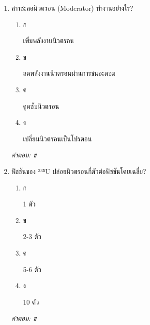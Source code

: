 \documentclass[12pt]{article}
\begin{document}
\begin{enumerate}[label=\arabic*., itemsep=0.5\baselineskip, topsep=0.5\baselineskip, leftmargin=*]
\item สารชะลอนิวตรอน (Moderator) ทำงานอย่างไร?
\begin{enumerate}[label=\alph*)., itemsep=0.3\baselineskip, topsep=0.3\baselineskip]
\item ก\ 
\begin{minipage}[t]{0.9\linewidth}
\raggedright เพิ่มพลังงานนิวตรอน
\end{minipage}
\item ข\ 
\begin{minipage}[t]{0.9\linewidth}
\raggedright ลดพลังงานนิวตรอนผ่านการชนอะตอม
\end{minipage}
\item ค\ 
\begin{minipage}[t]{0.9\linewidth}
\raggedright ดูดซับนิวตรอน
\end{minipage}
\item ง\ 
\begin{minipage}[t]{0.9\linewidth}
\raggedright เปลี่ยนนิวตรอนเป็นโปรตอน
\end{minipage}
\end{enumerate}
\vspace{-0.3\baselineskip}
\begin{small}
\textit{คำตอบ: ข}
\end{small}

\item ฟิชชันของ ²³⁵U ปล่อยนิวตรอนกี่ตัวต่อฟิชชันโดยเฉลี่ย?
\begin{enumerate}[label=\alph*)., itemsep=0.3\baselineskip, topsep=0.3\baselineskip]
\item ก\ 
\begin{minipage}[t]{0.9\linewidth}
\raggedright 1 ตัว
\end{minipage}
\item ข\ 
\begin{minipage}[t]{0.9\linewidth}
\raggedright 2-3 ตัว
\end{minipage}
\item ค\ 
\begin{minipage}[t]{0.9\linewidth}
\raggedright 5-6 ตัว
\end{minipage}
\item ง\ 
\begin{minipage}[t]{0.9\linewidth}
\raggedright 10 ตัว
\end{minipage}
\end{enumerate}
\vspace{-0.3\baselineskip}
\begin{small}
\textit{คำตอบ: ข}
\end{small}


\end{enumerate}
\end{document}
